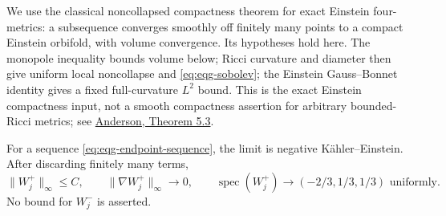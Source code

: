 We use the classical noncollapsed compactness theorem for exact Einstein
four-metrics: a subsequence converges smoothly off finitely many points
to a compact Einstein orbifold, with volume convergence.  Its hypotheses
hold here.  The monopole inequality bounds volume below; Ricci curvature
and diameter then give uniform local noncollapse and
\eqref{eq:eqg-sobolev}; the Einstein Gauss--Bonnet identity gives a fixed
full-curvature $L^2$ bound.  This is the exact Einstein compactness
input, not a smooth compactness assertion for arbitrary bounded-Ricci
metrics; see \href{https://arxiv.org/pdf/0810.4830}{Anderson, Theorem 5.3}.

\begin{proposition}
\label{prop:eqg-half-weyl}
For a sequence \eqref{eq:eqg-endpoint-sequence}, the limit is negative
Kähler--Einstein.  After discarding finitely many terms,
\begin{equation}\label{eq:eqg-half-weyl}
 \|W_j^+\|_\infty\leq C,\qquad
 \|\nabla W_j^+\|_\infty\longrightarrow0,
 \qquad
 \operatorname{spec}(W_j^+)\longrightarrow(-2/3,1/3,1/3)
 \text{ uniformly}.
\end{equation}
No bound for $W_j^-$ is asserted.
\end{proposition}

